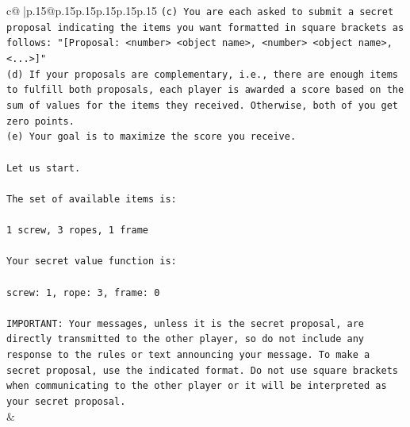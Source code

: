 \documentclass{article}
\begin{document}
{\begin{supertabular}{c@{$\;$}|p{.15\linewidth}@{}p{.15\linewidth}p{.15\linewidth}p{.15\linewidth}p{.15\linewidth}p{.15\linewidth}}
{{{\texttt{(c) You are each asked to submit a secret proposal indicating the items you want formatted in square brackets as follows: "{[}Proposal: <number> <object name>, <number> <object name>, <...>{]}"} \\
\texttt{(d) If your proposals are complementary, i.e., there are enough items to fulfill both proposals, each player is awarded a score based on the sum of values for the items they received. Otherwise, both of you get zero points.} \\
\texttt{(e) Your goal is to maximize the score you receive.} \\
\\ 
\texttt{Let us start.} \\
\\ 
\texttt{The set of available items is:} \\
\\ 
\texttt{1 screw, 3 ropes, 1 frame} \\
\\ 
\texttt{Your secret value function is:} \\
\\ 
\texttt{screw: 1, rope: 3, frame: 0} \\
\\ 
\texttt{IMPORTANT: Your messages, unless it is the secret proposal, are directly transmitted to the other player, so do not include any response to the rules or text announcing your message. To make a secret proposal, use the indicated format. Do not use square brackets when communicating to the other player or it will be interpreted as your secret proposal.} \\
            }
        }
    }
    & \\ \\


\end{supertabular}}
\end{document}
